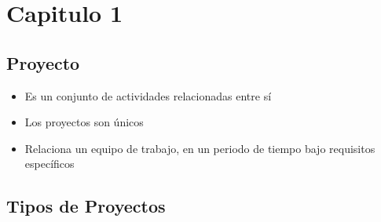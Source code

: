 \documentclass{article} %
\begin{document}
\newpage
\tableofcontents
\thispagestyle{plain} %
\thispagestyle{empty} %
\newpage

\setcounter{page}{1} %
\section{Capitulo 1}

\subsection{Proyecto}

\begin{itemize}[label={},left=0pt,align=parleft]
    \item \begin{highlightbox}[levelone] Es un conjunto de actividades relacionadas entre sí \end{highlightbox}
    \item \begin{highlightbox}[levelone] Los proyectos son únicos \end{highlightbox}
    \item \begin{highlightbox}[levelone] Relaciona un equipo de trabajo, en un periodo de tiempo bajo requisitos específicos \end{highlightbox}
\end{itemize}

\subsection{Tipos de Proyectos}
\end{document}
